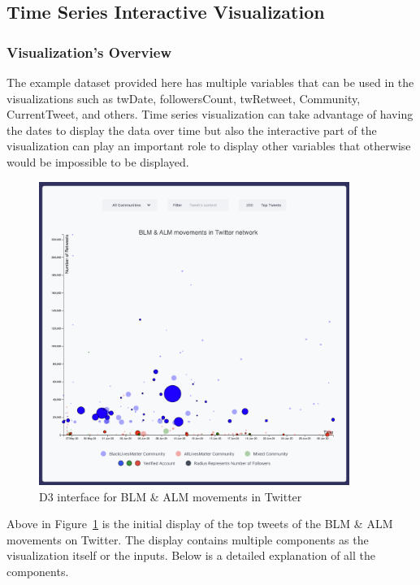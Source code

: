 \subsection{Time Series Interactive Visualization \cite{d3tool}}

\subsubsection{Visualization's Overview}

The example dataset provided here has multiple variables that can be used in the visualizations such as twDate, followersCount, twRetweet, Community, CurrentTweet, and others. Time series visualization can take advantage of having the dates to display the data over time but also the interactive part of the visualization can play an important role to display other variables that otherwise would be impossible to be displayed.



\begin{figure}[H]
\centering
\captionsetup{justification=centering}
\includegraphics[width=0.9\textwidth]{./pics/main.png}
\caption{D3 interface for BLM \& ALM movements in Twitter}
\label{fig:main-interface}
\end{figure}



Above in Figure~\ref{fig:main-interface} is the initial display of the top tweets of the  BLM \& ALM movements on Twitter. The display contains multiple components as the visualization itself or the inputs. Below is a detailed explanation of all the components.

